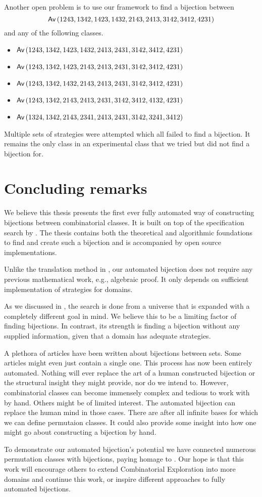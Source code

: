 Another open problem is to use our framework to find a bijection between
\[
\textsf{Av}\left(1243,1342,1423,1432,2143,2413,3142,3412,4231\right)
\]
and any of the following classes.
\begin{itemize}
\item $\textsf{Av}\left(1243,1342,1423,1432,2413,2431,3142,3412,4231\right)$
\item $\textsf{Av}\left(1243,1342,1423,2143,2413,2431,3142,3412,4231\right)$
\item $\textsf{Av}\left(1243,1342,1432,2143,2413,2431,3142,3412,4231\right)$
\item $\textsf{Av}\left(1243,1342,2143,2413,2431,3142,3412,4132,4231\right)$
\item $\textsf{Av}\left(1324,1342,2143,2341,2413,2431,3142,3241,3412\right)$
\end{itemize}
Multiple sets of strategies were attempted which all failed to find a bijection. It remains the only class in an experimental class that we tried but did not find a bijection for.


\section{Concluding remarks}
We believe this thesis presents the first ever fully automated way of constructing bijections between combinatorial classes. It is built on top of the specification search by . The thesis contains both the theoretical and algorithmic foundations to find and create such a bijection and is accompanied by open source implementations.

Unlike the translation method in , our automated bijection does not require any previous mathematical work, e.g., algebraic proof. It only depends on sufficient implementation of strategies for domains.

As we discussed in , the search is done from a universe that is expanded with a completely different goal in mind. We believe this to be a limiting factor of finding bijections. In contrast, its strength is finding a bijection without any supplied information, given that a domain has adequate strategies.

A plethora of articles have been written about bijections between sets. Some articles might even just contain a single one. This process has now been entirely automated. Nothing will ever replace the art of a human constructed bijection or the structural insight they might provide, nor do we intend to. However, combinatorial classes can become immensely complex and tedious to work with by hand. Others might be of limited interest. The automated bijection can replace the human mind in those cases. There are after all infinite bases for which we can define permutaion classes. It could also provide some insight into how one might go about constructing a bijection by hand.

To demonstrate our automated bijection's potential we have connected numerous permutation classes with bijections, paying homage to . Our hope is that this work will encourage others to extend Combinatorial Exploration into more domains and continue this work, or inspire different approaches to fully automated bijections.